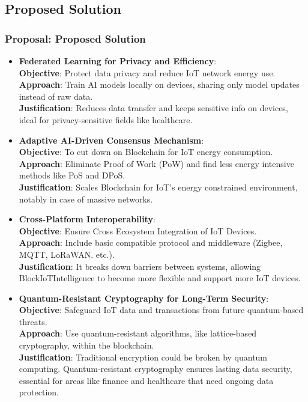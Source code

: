 \documentclass [xcolor=svgnames] {beamer}
\begin{document}
\begin{frame}[allowframebreaks]
\footnotesize
\subsection{Proposed Solution}
\frametitle{Proposal: Proposed Solution}

\begin{itemize}

\item \textbf{Federated Learning for Privacy and Efficiency}:\\
\textbf{Objective}: Protect data privacy and reduce IoT network energy use.\\
\textbf{Approach}: Train AI models locally on devices, sharing only model updates instead of raw data.\\
\textbf{Justification}: Reduces data transfer and keeps sensitive info on devices, ideal for privacy-sensitive fields like healthcare.

\item \textbf{Adaptive AI-Driven Consensus Mechanism}:\\
\textbf{Objective}: To cut down on Blockchain for IoT energy consumption.\\
\textbf{Approach}: Eliminate Proof of Work (PoW) and find less energy intensive methods like PoS and DPoS.\\
\textbf{Justification}: Scales Blockchain for IoT’s energy constrained environment, notably in case of massive networks.

\item \textbf{Cross-Platform Interoperability}:\\
\textbf{Objective}: Ensure Cross Ecosystem Integration of IoT Devices.\\
\textbf{Approach}: Include basic compatible protocol and middleware (Zigbee, MQTT, LoRaWAN. etc.).\\
\textbf{Justification}: It breaks down barriers between systems, allowing BlockIoTIntelligence to become more flexible and support more IoT devices.

\item \textbf{Quantum-Resistant Cryptography for Long-Term Security}:\\
\textbf{Objective}: Safeguard IoT data and transactions from future quantum-based threats.\\
\textbf{Approach}: Use quantum-resistant algorithms, like lattice-based cryptography, within the blockchain.\\
\textbf{Justification}: Traditional encryption could be broken by quantum computing. Quantum-resistant cryptography ensures lasting data security, essential for areas like finance and healthcare that need ongoing data protection.


\end{itemize}
\end{frame}
\end{document}

